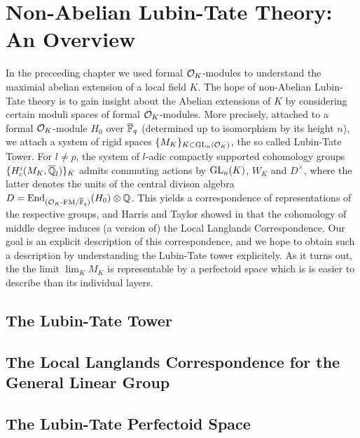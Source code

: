 \documentclass[../main.tex]{subfiles}
\begin{document}
\section{Non-Abelian Lubin-Tate Theory: An Overview} %
\label{sec:Non-Abelian Lubin-Tate Theory: An Overview}
In the preceeding chapter we used formal $\mathcal{O}_K$-modules to understand the 
maximial abelian extension of a local field $K$. The hope of non-Abelian Lubin-Tate
theory is to gain insight about the Abelian extensions of $K$ by considering
certain moduli spaces of formal $\mathcal{O}_K$-modules.
More precisely, attached to a formal $\mathcal{O}_K$-module $H_0$ over ${\overline {\mathbb{F}}_q}$ (determined
up to isomorphism by its height $n$), we attach a system of rigid spaces 
$\{M_K\}_{K \subset \operatorname{GL}_n(\mathcal{O}_K)}$, the so called Lubin-Tate Tower. For $l \neq p$, 
the system of $l$-adic compactly supported cohomology groups $\{H_c^{i}(M_K,
\overline {\mathbb{Q}}_l)\}_K$ admits commuting actions by $\operatorname{GL}_n(K)$, $W_K$ and $D^\times$,
where the latter denotes the units of the central divison algebra $D =
\operatorname{End}_{{({\mathcal{O}_K}\text-\mathrm{FM}/{{\overline {\mathbb{F}}_q}})}}(H_0) \otimes \mathbb{Q}$. This yields a correspondence of 
representations of the respective groups, and Harris and Taylor showed in
\cite{HTShimura} that the cohomology of middle degree induces (a version of)
the Local Langlands Correspondence. Our goal is an explicit description of 
this correspondence, and we hope to obtain such a description by 
understanding the Lubin-Tate tower explicitely.
As it turns out, the the limit $\lim_{K} M_K$ is representable by a perfectoid space
which is is easier to describe than its individual layers.

\subsection{The Lubin-Tate Tower} %
\label{sub:The Lubin-Tate Tower}



\subsection{The Local Langlands Correspondence for the General Linear Group} %
\label{sub:The Local Langlands Correspondence for the General Linear Group}


\subsection{The Lubin-Tate Perfectoid Space} %
\label{sub:The Lubin-Tate Perfectoid Space}


\end{document}

